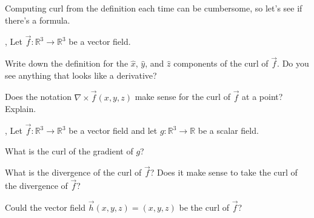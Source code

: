 \documentclass[letter]{article}
\newcommand{\R}{\mathbb{R}}
\renewcommand{\d}{\mathrm{d}}
\renewcommand{\emph}[1]{{\color{defcolor} \textbf{\textit{##1}}}}
\begin{document}
	Computing curl from the definition each time can be cumbersome, so let's see
	if there's a formula.
	
	\sep
	Let $\vec f:\R^3\to\R^3$ be a vector field.
	\begin{Enum}
		\item Write down the definition
			for the $\hat x$, $\hat y$, and $\hat z$ components of the curl of $\vec f$.
			Do you see anything that looks like a derivative?
		\item Does the notation $\nabla \times \vec f(x,y,z)$ make sense for the curl of
			$\vec f$ at a point?  Explain.
	\end{Enum}

	\sep
	Let $\vec f:\R^3\to\R^3$ be a vector field and let $g:\R^3\to \R$ be a scalar field.
	\begin{Enum}
		\item What is the curl of the gradient of $g$?
		\item What is the divergence of the curl of $\vec f$?  Does it
			make sense to take the curl of the divergence of $\vec f$?
		\item Could the vector field $\vec h(x,y,z) = (x,y,z)$ be the curl
			of $\vec f$?
	\end{Enum}

	\vspace{-1cm}

	
	
\newpage
\end{document}
